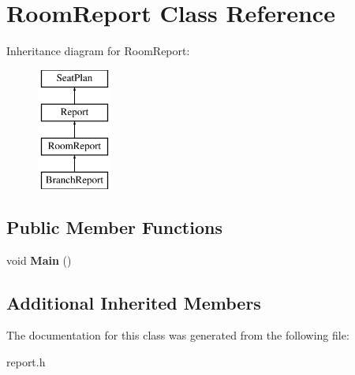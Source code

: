 \hypertarget{classRoomReport}{\section{Room\-Report Class Reference}
\label{classRoomReport}
}
Inheritance diagram for Room\-Report\-:\begin{figure}[H]
\begin{center}
\leavevmode
\includegraphics[height=4.000000cm]{classRoomReport}
\end{center}
\end{figure}
\subsection*{Public Member Functions}
\begin{DoxyCompactItemize}
\item 
\hypertarget{classRoomReport_aa6eff185efa1c6205ec1446ed66d9766}{void {\bfseries Main} ()}\label{classRoomReport_aa6eff185efa1c6205ec1446ed66d9766}

\end{DoxyCompactItemize}
\subsection*{Additional Inherited Members}


The documentation for this class was generated from the following file\-:\begin{DoxyCompactItemize}
\item 
report.\-h\end{DoxyCompactItemize}
